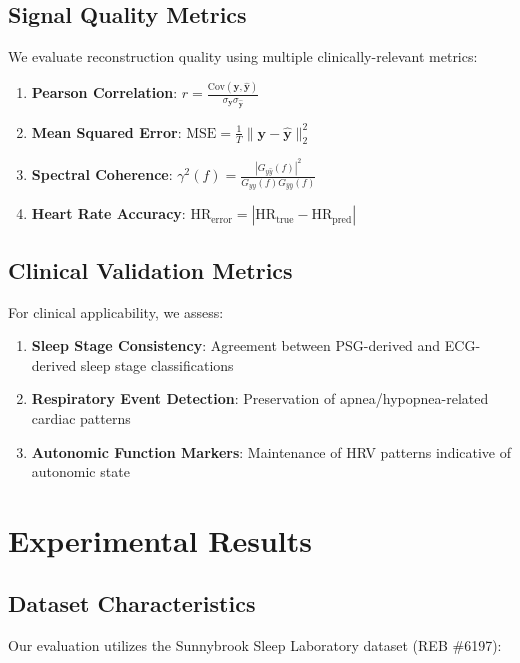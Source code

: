 \documentclass[11pt]{article}
\begin{document}
\subsection{Signal Quality Metrics}

We evaluate reconstruction quality using multiple clinically-relevant metrics:

\begin{enumerate}
    \item \textbf{Pearson Correlation}: $r = \frac{\text{Cov}(\mathbf{y}, \hat{\mathbf{y}})}{\sigma_{\mathbf{y}} \sigma_{\hat{\mathbf{y}}}}$
    \item \textbf{Mean Squared Error}: $\text{MSE} = \frac{1}{T} \|\mathbf{y} - \hat{\mathbf{y}}\|_2^2$
    \item \textbf{Spectral Coherence}: $\gamma^2(f) = \frac{|G_{y\hat{y}}(f)|^2}{G_{yy}(f) G_{\hat{y}\hat{y}}(f)}$
    \item \textbf{Heart Rate Accuracy}: $\text{HR}_{\text{error}} = |\text{HR}_{\text{true}} - \text{HR}_{\text{pred}}|$
\end{enumerate}

\subsection{Clinical Validation Metrics}

For clinical applicability, we assess:

\begin{enumerate}
    \item \textbf{Sleep Stage Consistency}: Agreement between PSG-derived and ECG-derived sleep stage classifications
    \item \textbf{Respiratory Event Detection}: Preservation of apnea/hypopnea-related cardiac patterns
    \item \textbf{Autonomic Function Markers}: Maintenance of HRV patterns indicative of autonomic state
\end{enumerate}

\section{Experimental Results}

\subsection{Dataset Characteristics}

Our evaluation utilizes the Sunnybrook Sleep Laboratory dataset (REB \#6197):
\end{document}
